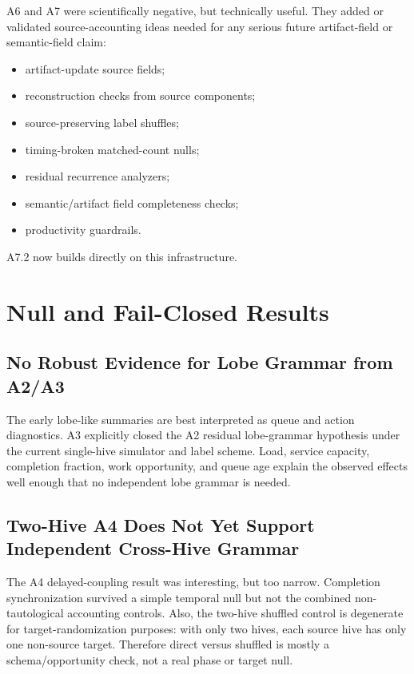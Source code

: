 \documentclass[11pt]{article}
\begin{document}
A6 and A7 were scientifically negative, but technically useful. They added or
validated source-accounting ideas needed for any serious future artifact-field
or semantic-field claim:

\begin{itemize}
\item artifact-update source fields;
\item reconstruction checks from source components;
\item source-preserving label shuffles;
\item timing-broken matched-count nulls;
\item residual recurrence analyzers;
\item semantic/artifact field completeness checks;
\item productivity guardrails.
\end{itemize}

A7.2 now builds directly on this infrastructure.

\section{Null and Fail-Closed Results}

\subsection{No Robust Evidence for Lobe Grammar from A2/A3}

The early lobe-like summaries are best interpreted as queue and action
diagnostics. A3 explicitly closed the A2 residual lobe-grammar hypothesis under
the current single-hive simulator and label scheme. Load, service capacity,
completion fraction, work opportunity, and queue age explain the observed
effects well enough that no independent lobe grammar is needed.

\subsection{Two-Hive A4 Does Not Yet Support Independent Cross-Hive Grammar}

The A4 delayed-coupling result was interesting, but too narrow. Completion
synchronization survived a simple temporal null but not the combined
non-tautological accounting controls. Also, the two-hive shuffled control is
degenerate for target-randomization purposes: with only two hives, each source
hive has only one non-source target. Therefore direct versus shuffled is mostly
a schema/opportunity check, not a real phase or target null.
\end{document}
